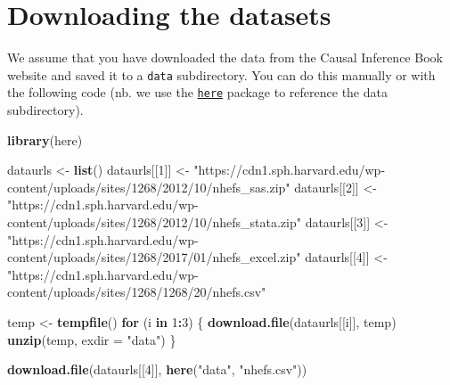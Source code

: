 \documentclass[
  10pt,
]{book}
\newenvironment{Shaded}{\begin{snugshade}}{\end{snugshade}}
\newcommand{\ControlFlowTok}[1]{\textcolor[rgb]{0.13,0.29,0.53}{\textbf{#1}}}
\newcommand{\DataTypeTok}[1]{\textcolor[rgb]{0.13,0.29,0.53}{#1}}
\newcommand{\DecValTok}[1]{\textcolor[rgb]{0.00,0.00,0.81}{#1}}
\newcommand{\KeywordTok}[1]{\textcolor[rgb]{0.13,0.29,0.53}{\textbf{#1}}}
\newcommand{\NormalTok}[1]{#1}
\newcommand{\OperatorTok}[1]{\textcolor[rgb]{0.81,0.36,0.00}{\textbf{#1}}}
\newcommand{\StringTok}[1]{\textcolor[rgb]{0.31,0.60,0.02}{#1}}
\begin{document}
\hypertarget{downloading-the-datasets}{%
\section{Downloading the datasets}\label{downloading-the-datasets}}

We assume that you have downloaded the data from the Causal Inference Book website and saved it to a \texttt{data} subdirectory. You can do this manually or with the following code (nb. we use the \href{https://here.r-lib.org/}{\texttt{here}} package to reference the data subdirectory).

\begin{Shaded}
\begin{Highlighting}[]
\KeywordTok{library}\NormalTok{(here)}
\end{Highlighting}
\end{Shaded}

\begin{Shaded}
\begin{Highlighting}[]
\NormalTok{dataurls \textless{}{-}}\StringTok{ }\KeywordTok{list}\NormalTok{()}
\NormalTok{dataurls[[}\DecValTok{1}\NormalTok{]] \textless{}{-}}\StringTok{ "https://cdn1.sph.harvard.edu/wp{-}content/uploads/sites/1268/2012/10/nhefs\_sas.zip"}
\NormalTok{dataurls[[}\DecValTok{2}\NormalTok{]] \textless{}{-}}\StringTok{ "https://cdn1.sph.harvard.edu/wp{-}content/uploads/sites/1268/2012/10/nhefs\_stata.zip"}
\NormalTok{dataurls[[}\DecValTok{3}\NormalTok{]] \textless{}{-}}\StringTok{ "https://cdn1.sph.harvard.edu/wp{-}content/uploads/sites/1268/2017/01/nhefs\_excel.zip"}
\NormalTok{dataurls[[}\DecValTok{4}\NormalTok{]] \textless{}{-}}\StringTok{ "https://cdn1.sph.harvard.edu/wp{-}content/uploads/sites/1268/1268/20/nhefs.csv"}

\NormalTok{temp \textless{}{-}}\StringTok{ }\KeywordTok{tempfile}\NormalTok{()}
\ControlFlowTok{for}\NormalTok{ (i }\ControlFlowTok{in} \DecValTok{1}\OperatorTok{:}\DecValTok{3}\NormalTok{) \{}
    \KeywordTok{download.file}\NormalTok{(dataurls[[i]], temp)}
    \KeywordTok{unzip}\NormalTok{(temp, }\DataTypeTok{exdir =} \StringTok{"data"}\NormalTok{)}
\NormalTok{\}}

\KeywordTok{download.file}\NormalTok{(dataurls[[}\DecValTok{4}\NormalTok{]], }\KeywordTok{here}\NormalTok{(}\StringTok{"data"}\NormalTok{, }\StringTok{"nhefs.csv"}\NormalTok{))}
\end{Highlighting}
\end{Shaded}

\mainmatter
\end{document}
